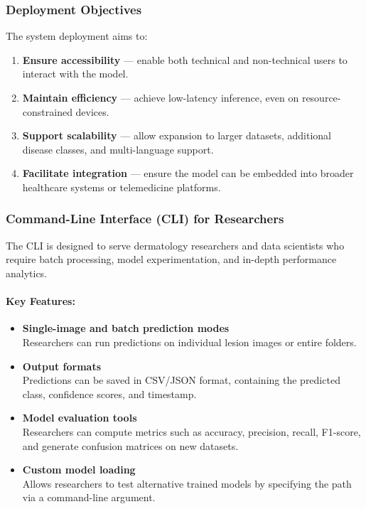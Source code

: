 \documentclass[
  12pt,
  oneside]{article}
\providecommand{\tightlist}{%
  \setlength{\itemsep}{0pt}\setlength{\parskip}{0pt}}
\begin{document}
\subsubsection{Deployment Objectives}\label{deployment-objectives}

The system deployment aims to:

\begin{enumerate}
\def\labelenumi{\arabic{enumi}.}
\tightlist
\item
  \textbf{Ensure accessibility} --- enable both technical and
  non-technical users to interact with the model.
\item
  \textbf{Maintain efficiency} --- achieve low-latency inference, even
  on resource-constrained devices.
\item
  \textbf{Support scalability} --- allow expansion to larger datasets,
  additional disease classes, and multi-language support.
\item
  \textbf{Facilitate integration} --- ensure the model can be embedded
  into broader healthcare systems or telemedicine platforms.
\end{enumerate}

\subsubsection{Command-Line Interface (CLI) for
Researchers}\label{command-line-interface-cli-for-researchers}

The CLI is designed to serve dermatology researchers and data scientists
who require batch processing, model experimentation, and in-depth
performance analytics.

\paragraph{Key Features:}\label{key-features}

\begin{itemize}
\tightlist
\item
  \textbf{Single-image and batch prediction modes}\\
  Researchers can run predictions on individual lesion images or entire
  folders.
\item
  \textbf{Output formats}\\
  Predictions can be saved in CSV/JSON format, containing the predicted
  class, confidence scores, and timestamp.
\item
  \textbf{Model evaluation tools}\\
  Researchers can compute metrics such as accuracy, precision, recall,
  F1-score, and generate confusion matrices on new datasets.
\item
  \textbf{Custom model loading}\\
  Allows researchers to test alternative trained models by specifying
  the path via a command-line argument.
\end{itemize}
\end{document}
